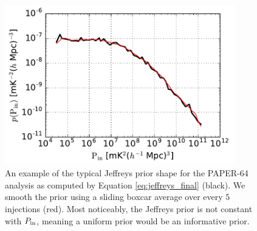 \documentclass[preprint2,numberedappendix,tighten]{aastex6}  %
\begin{document}
\begin{figure}
	\centering
	\includegraphics[width=10cm]{plots/jeffrey_prior.pdf}
	\caption{An example of the typical Jeffreys prior shape for the PAPER-64 analysis as computed by Equation \eqref{eq:jeffreys_final} (black). We smooth the prior using a sliding boxcar average over every $5$ injections (red). Most noticeably, the Jeffreys prior is not constant with $P_{\rm in}$, meaning a uniform prior would be an informative prior.}
	\label{fig:jeffreys2}
\end{figure}
\end{document}
